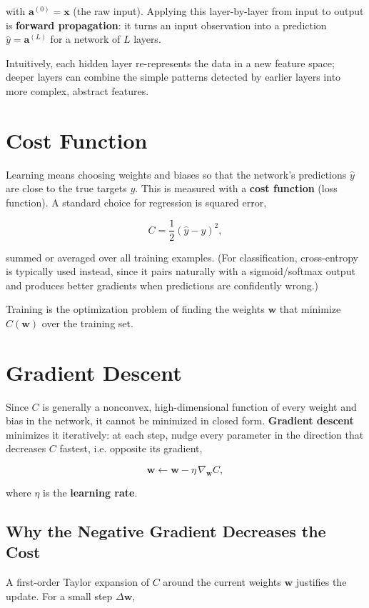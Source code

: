 \documentclass[11pt]{article}
\begin{document}
with $\mathbf{a}^{(0)} = \mathbf{x}$ (the raw input). Applying this
layer-by-layer from input to output is \textbf{forward propagation}: it
turns an input observation into a prediction $\hat{y} = \mathbf{a}^{(L)}$
for a network of $L$ layers.

Intuitively, each hidden layer re-represents the data in a new feature
space; deeper layers can combine the simple patterns detected by earlier
layers into more complex, abstract features.

\section{Cost Function}

Learning means choosing weights and biases so that the network's
predictions $\hat{y}$ are close to the true targets $y$. This is measured
with a \textbf{cost function} (loss function). A standard choice for
regression is squared error,

\[
  C = \frac{1}{2}\left(\hat{y} - y\right)^2,
\]

summed or averaged over all training examples. (For classification,
cross-entropy is typically used instead, since it pairs naturally with a
sigmoid/softmax output and produces better gradients when predictions are
confidently wrong.)

Training is the optimization problem of finding the weights $\mathbf{w}$
that minimize $C(\mathbf{w})$ over the training set.

\section{Gradient Descent}

Since $C$ is generally a nonconvex, high-dimensional function of every
weight and bias in the network, it cannot be minimized in closed form.
\textbf{Gradient descent} minimizes it iteratively: at each step, nudge
every parameter in the direction that decreases $C$ fastest, i.e. opposite
its gradient,

\[
  \mathbf{w} \gets \mathbf{w} - \eta \, \nabla_{\mathbf{w}} C,
\]

where $\eta$ is the \textbf{learning rate}.

\subsection{Why the Negative Gradient Decreases the Cost}

A first-order Taylor expansion of $C$ around the current weights
$\mathbf{w}$ justifies the update. For a small step $\Delta\mathbf{w}$,
\end{document}
